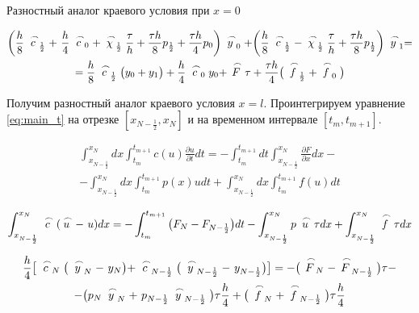 Разностный аналог краевого условия при $x=0$

\begin{multline}\label{eq:diff_x0}
    \bigg( \frac{h}{8} \LittleCap{c}_\frac{1}{2} +\ \frac{h}{4} \LittleCap{c}_0 + \LittleCap{\chi}_\frac{1}{2} \frac{\tau}{h} + \frac{\tau h}{8} p_\frac{1}{2} + \frac{\tau h}{4} p_0 \bigg) \LittleCap{y}_0 + \bigg( \frac{h}{8} \LittleCap{c}_\frac{1}{2} - \LittleCap{\chi}_\frac{1}{2} \frac{\tau}{h} + \frac{\tau h}{8} p_\frac{1}{2} \bigg) \LittleCap{y}_1 = \\
    = \frac{h}{8} \LittleCap{c}_\frac{1}{2} \big( y_0 + y_1 \big) + \frac{h}{4} \LittleCap{c}_0 y_0 + \LittleCap{F}\tau + \frac{\tau h}{4} \big(\LittleCap{f}_\frac{1}{2} + \LittleCap{f}_0 \big)
\end{multline}

Получим разностный аналог краевого условия $x=l$. Проинтегрируем уравнение \ref{eq:main_t} на отрезке $[x_{N-\frac{1}{2}}, x_N]$ и на временном интервале $[t_m, t_{m+1}]$.

\begin{multline*}
    \int_{x_{N-\frac{1}{2}}}^{x_N} dx \int_{t_m}^{t_{m+1}} c(u) \frac{\partial u}{\partial t} dt = - \int_{t_m}^{t_{m+1}} dt \int_{x_{N-\frac{1}{2}}}^{x_N} \frac{\partial F}{\partial x} dx - \\
    - \int_{x_{N-\frac{1}{2}}}^{x_N} dx \int_{t_m}^{t_{m+1}} p(x) u dt + \int_{x_{N-\frac{1}{2}}}^{x_N} dx \int_{t_m}^{t_{m+1}} f(u) dt
\end{multline*}

\begin{equation*}
    \int_{x_{N-\frac{1}{2}}}^{x_N} \LittleCap{c} (\LittleCap{u} -\ u) dx = - \int_{t_m}^{t_{m+1}} \big( F_N - F_{N - \frac{1}{2}} \big) dt - \int_{x_{N-\frac{1}{2}}}^{x_N} p \LittleCap{u} \tau dx + \int_{x_{N - \frac{1}{2}}}^{x_N} \LittleCap{f} \tau dx
\end{equation*}

\begin{multline*}
    \frac{h}{4} \big[ \LittleCap{c}_N \big( \LittleCap{y}_N -\ y_N \big) + \LittleCap{c}_{N-\frac{1}{2}} \big( \LittleCap{y}_{N-\frac{1}{2}} -\ y_{N-\frac{1}{2}} \big) \big] = - \big( \LittleCap{F}_N - \LittleCap{F}_{N-\frac{1}{2}} \big) \tau - \\
    - \big( p_N \LittleCap{y}_N +\ p_{N-\frac{1}{2}} \LittleCap{y}_{N-\frac{1}{2}} \big) \tau \frac{h}{4} + \big( \LittleCap{f}_N + \LittleCap{f}_{N-\frac{1}{2}} \big) \tau \frac{h}{4}
\end{multline*}

